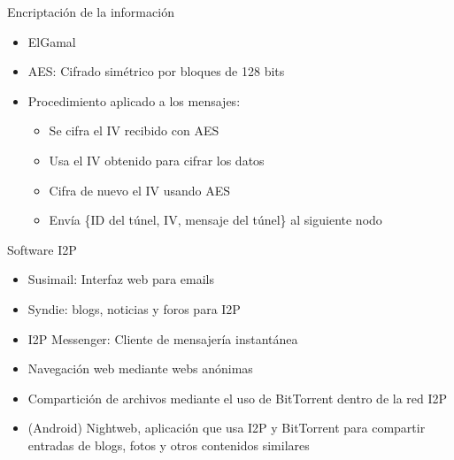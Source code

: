 \documentclass[spanish]{beamer}
\begin{document}
\begin{frame}{Encriptación de la información}

\begin{itemize}
	\item ElGamal
	\item AES: Cifrado simétrico por bloques de 128 bits
	\item Procedimiento aplicado a los mensajes:
	\begin{itemize}
		\item Se cifra el IV recibido con AES
		\item Usa el IV obtenido para cifrar los datos
		\item Cifra de nuevo el IV usando AES
		\item Envía \{ID del túnel, IV, mensaje del túnel\} al siguiente nodo
	\end{itemize}
\end{itemize}



\end{frame}



\begin{frame}{Software I2P}
	

\begin{itemize}
	\item Susimail: Interfaz web  para emails
	\item Syndie: blogs, noticias y foros para I2P
	\item I2P Messenger: Cliente de mensajería instantánea
	\item Navegación web mediante webs anónimas
	\item Compartición de archivos mediante el uso de BitTorrent dentro de la red I2P
	\item (Android) Nightweb, aplicación que usa I2P y BitTorrent para compartir entradas
	de blogs, fotos y otros contenidos similares
\end{itemize}
	
\end{frame}
\end{document}
